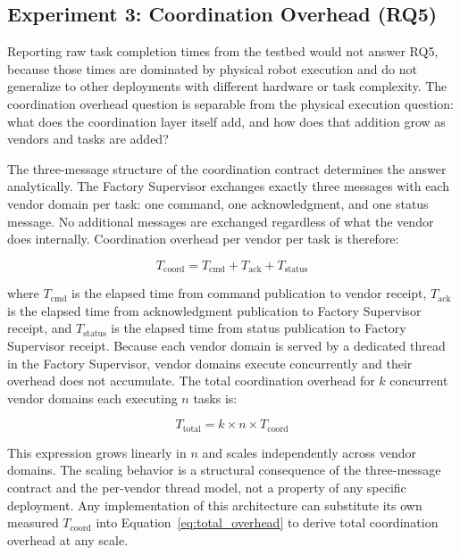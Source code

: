 \documentclass[a4paper,fleqn]{cas-dc}
\begin{document}
\subsection{Experiment 3: Coordination Overhead (RQ5)}

Reporting raw task completion times from the testbed would not answer RQ5, because those times are dominated by physical robot execution and do not generalize to other deployments with different hardware or task complexity. The coordination overhead question is separable from the physical execution question: what does the coordination layer itself add, and how does that addition grow as vendors and tasks are added?

The three-message structure of the coordination contract determines the answer analytically. The Factory Supervisor exchanges exactly three messages with each vendor domain per task: one command, one acknowledgment, and one status message. No additional messages are exchanged regardless of what the vendor does internally. Coordination overhead per vendor per task is therefore:

\begin{equation}
T_{\text{coord}} = T_{\text{cmd}} + T_{\text{ack}} + T_{\text{status}}
\label{eq:coord_overhead}
\end{equation}

where $T_{\text{cmd}}$ is the elapsed time from command publication to vendor receipt, $T_{\text{ack}}$ is the elapsed time from acknowledgment publication to Factory Supervisor receipt, and $T_{\text{status}}$ is the elapsed time from status publication to Factory Supervisor receipt. Because each vendor domain is served by a dedicated thread in the Factory Supervisor, vendor domains execute concurrently and their overhead does not accumulate. The total coordination overhead for $k$ concurrent vendor domains each executing $n$ tasks is:

\begin{equation}
T_{\text{total}} = k \times n \times T_{\text{coord}}
\label{eq:total_overhead}
\end{equation}

This expression grows linearly in $n$ and scales independently across vendor domains. The scaling behavior is a structural consequence of the three-message contract and the per-vendor thread model, not a property of any specific deployment. Any implementation of this architecture can substitute its own measured $T_{\text{coord}}$ into Equation~\ref{eq:total_overhead} to derive total coordination overhead at any scale.
\end{document}
